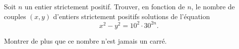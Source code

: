 \documentclass[varwidth]{standalone}
\begin{document}
    Soit $n$ un entier strictement positif. Trouver, en fonction de $n$, le nombre de couples $(x, y)$ d'entiers strictement positifs solutions de l'\'equation
    \[
        x^2 - y^2 = 10^2 \cdot 30^{2n}.  
    \]

    Montrer de plus que ce nombre n'est jamais un carr\'e.
\end{document}
